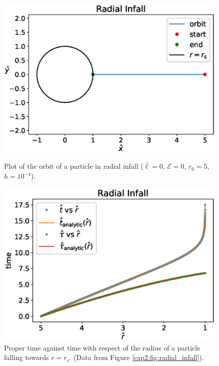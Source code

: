 \begin{figure}[h]
    \begin{minipage}{0.48\textwidth}
        \centering
        \includegraphics[width=\textwidth]{Figures/chapter2/radial_infall.eps}
        \caption{Plot of the orbit of a particle in radial infall
        ($\hat \ell = 0$, $\mathcal E = 0$, $r_0 = 5$, $h = 10^{-4}$). \\}
        \label{cap2:fig:radial_infall}
    \end{minipage}
    \hspace{0.015 \textwidth}
    \begin{minipage}{0.48\textwidth}
        \centering
        \includegraphics[width=\textwidth]{Figures/chapter2/t_vs_tau.eps}
        \caption{Proper time against \Sh time with respect of the radius of a
        particle falling towards $r = r_s$.
        (Data from Figure \ref{cap2:fig:radial_infall}).}
        \label{cap2:fig:t_vs_tau}
    \end{minipage}
\end{figure}

